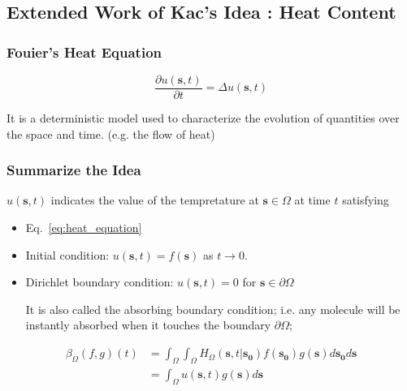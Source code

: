        

  \subsection{Extended Work of Kac’s Idea \cite{desjardins1994heat}\cite{vandenberg1994heat}: Heat Content}
        
    \subsubsection{Fouier's Heat Equation \cite{baron1878analytical}}
        \par
        \begin{equation}\label{eq:heat_equation}
          \frac{\partial u(\bm{s}, t)}{\partial t} = \Delta u(\bm{s}, t)
        \end{equation}
        
        \par
        It is a deterministic model used to characterize the evolution of quantities over the space and time. (e.g. the flow of heat)
        
     \subsubsection{Summarize the Idea}
        
        \par
        $u(\bm{s}, t)$ indicates the value of the tempretature at $\bm{s} \in \Omega$ at time $t$ satisfying
          \begin{itemize}
            \item Eq.~\ref{eq:heat_equation}
            \item Initial condition: $u(\bm{s}, t) = f(\bm{s})$ as $t \rightarrow 0$.
            \item Dirichlet boundary condition: $u(\bm{s}, t)=0$ for $\bm{s} \in \partial \Omega$
             \par
             It is also called the absorbing boundary condition; i.e. any molecule will be instantly absorbed when it touches the boundary $\partial \Omega$;
          \end{itemize}
          
         
          \par
          \begin{align}
            \beta_{\Omega}(f, g)(t) &= \int_{\Omega} \int_{\Omega} H_{\Omega}(\bm{s}, t | \bm{s_0}) f(\bm{s_0}) g(\bm{s}) d\bm{s_0} d\bm{s} \label{eq:integral_full} \\
            &= \int_{\Omega} u(\bm{s}, t) g(\bm{s}) d\bm{s} \label{eq:integral_convol}
          \end{align}

